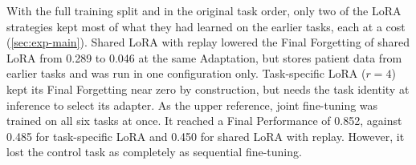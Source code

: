
With the full training split and in the original task order, only two of the LoRA strategies kept most of what they had learned on the earlier tasks, each at a cost (\cref{sec:exp-main}).
Shared LoRA with replay lowered the Final Forgetting of shared LoRA from 0.289 to 0.046 at the same Adaptation, but stores patient data from earlier tasks and was run in one configuration only.
Task-specific LoRA ($r = 4$) kept its Final Forgetting near zero by construction, but needs the task identity at inference to select its adapter.
As the upper reference, joint fine-tuning was trained on all six tasks at once.
It reached a Final Performance of 0.852, against 0.485 for task-specific LoRA and 0.450 for shared LoRA with replay.
However, it lost the control task as completely as sequential fine-tuning.

